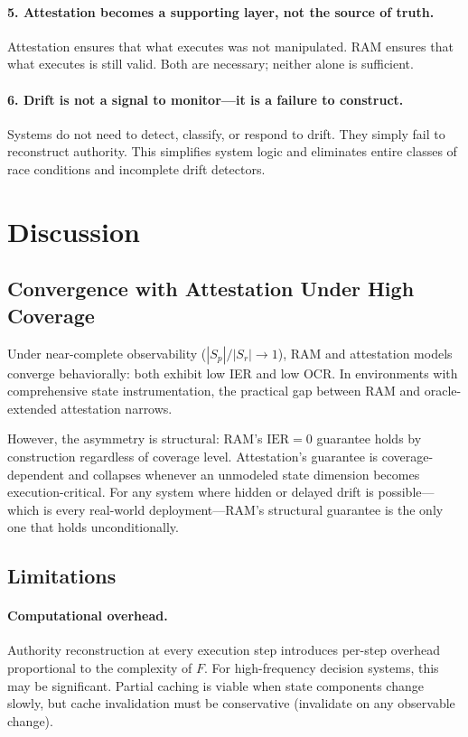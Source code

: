 \documentclass[11pt]{article}
\newcommand{\Sr}{S_r}
\newcommand{\Sp}{S_p}
\newcommand{\IER}{\mathrm{IER}}
\begin{document}
\paragraph{5. Attestation becomes a supporting layer, not the source of truth.}
Attestation ensures that what executes was not manipulated.
RAM ensures that what executes is still valid.
Both are necessary; neither alone is sufficient.

\paragraph{6. Drift is not a signal to monitor---it is a failure to construct.}
Systems do not need to detect, classify, or respond to drift.
They simply fail to reconstruct authority.
This simplifies system logic and eliminates entire classes of race conditions
and incomplete drift detectors.

\section{Discussion}
\label{sec:discussion}

\subsection{Convergence with Attestation Under High Coverage}

Under near-complete observability ($|\Sp|/|\Sr| \to 1$), RAM and attestation
models converge behaviorally: both exhibit low IER and low OCR.
In environments with comprehensive state instrumentation, the practical gap
between RAM and oracle-extended attestation narrows.

However, the asymmetry is structural:
RAM's $\IER = 0$ guarantee holds by construction regardless of coverage level.
Attestation's guarantee is coverage-dependent and collapses whenever an
unmodeled state dimension becomes execution-critical.
For any system where hidden or delayed drift is possible---which is every
real-world deployment---RAM's structural guarantee is the only one that holds
unconditionally.

\subsection{Limitations}

\paragraph{Computational overhead.}
Authority reconstruction at every execution step introduces per-step overhead
proportional to the complexity of $F$.
For high-frequency decision systems, this may be significant.
Partial caching is viable when state components change slowly, but cache
invalidation must be conservative (invalidate on any observable change).
\end{document}
